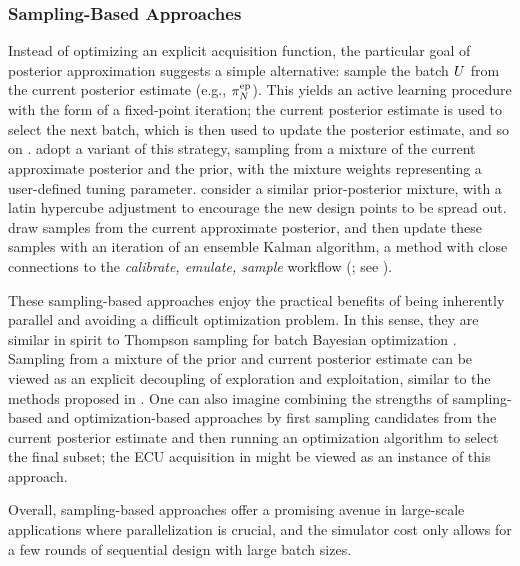 \documentclass[12pt]{article}
\begin{document}
\subsubsection{Sampling-Based Approaches}
Instead of optimizing an explicit acquisition function, the particular goal of posterior approximation
suggests a simple alternative: sample the batch $U$ from the current posterior estimate (e.g., ${\pi}_{N}^{\mathrm{ep}}$).
This yields an active learning procedure with the form of a fixed-point iteration; the current posterior estimate is 
used to select the next batch, which is then used to update the posterior estimate, and so on 
\citep{murrayNPE,hydrologicalModel,quantileApprox,hydrologicalModel2}. \citet{FerEmulation} adopt a 
variant of this strategy, sampling from a mixture of the current approximate posterior and the prior, with the mixture 
weights representing a user-defined tuning parameter. \citet{turbulenceModelAdaptiveLHS} consider a similar 
prior-posterior mixture, with a latin hypercube adjustment to 
encourage the new design points to be spread out. \citet{adaptiveMultimodal} draw samples from the current approximate 
posterior, and then update these samples with an iteration of an ensemble Kalman algorithm, a method with close
connections to the \textit{calibrate, emulate, sample} workflow (\citet{CES}; see ).

These sampling-based approaches enjoy the practical benefits of being inherently parallel and avoiding a difficult
optimization problem. In this sense, they are similar in spirit to Thompson sampling for
batch Bayesian optimization \citep{parallelBOThompson}. Sampling from a mixture of the prior
and current posterior estimate can be viewed as an explicit decoupling of exploration and exploitation, similar to the
methods proposed in \citet{gp_surrogates_random_exploration}. One can also imagine combining the strengths of
sampling-based and optimization-based approaches by first sampling candidates from the current posterior estimate 
and then running an optimization algorithm to select the final subset; the ECU acquisition in  
might be viewed as an instance of this approach. 

Overall, sampling-based approaches offer a promising avenue in large-scale applications where parallelization is crucial, 
and the simulator cost only allows for a few rounds of sequential design with large batch sizes.
\end{document}
